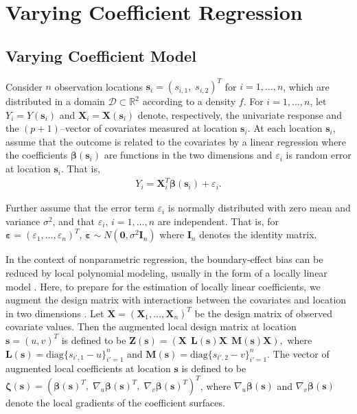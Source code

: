 \documentclass[authoryear,review, 12pt]{elsarticle}
\begin{document}
\section{Varying Coefficient Regression\label{sec:vcr}}

\subsection{Varying Coefficient Model}

Consider $n$ observation locations $\bm{s}_{i}=(s_{i,1},\; s_{i,2})^{T}$
for $i=1,\dots,n$, which are distributed in a domain $\mathcal{D}\subset\mathbb{R}^{2}$
according to a density $f$. For $i=1,\dots,n$, let $Y_{i}=Y(\bm{s}_{i})$
and $\bm{X}_{i}=\bm{X}(\bm{s}_{i})$ denote, respectively, the univariate
response and the $(p+1)$--vector of covariates measured at location
$\bm{s}_{i}$. At each location $\bm{s}_{i}$, assume that the outcome
is related to the covariates by a linear regression where the coefficients
$\bm{\beta}(\bm{s}_{i})$ are functions in the two dimensions and
$\varepsilon_{i}$ is random error at location $\bm{s}_{i}$. That
is, 
\begin{align}
Y_{i}=\bm{X}_{i}^{T}\bm{\beta}(\bm{s}_{i})+\varepsilon_{i}.\label{eq:lm(s)}
\end{align}

Further assume that the error term $\varepsilon_{i}$ is normally
distributed with zero mean and variance $\sigma^{2}$, and that $\varepsilon_{i}$,
$i=1,\dots,n$ are independent. That is, for $\bm{\varepsilon}=\left(\varepsilon_{1},\dots,\varepsilon_{n}\right)^{T}$,
$\bm{\varepsilon}\sim N\left(\bm{0},\sigma^{2}\bm{I}_{n}\right)$
where $\bm{I}_{n}$ denotes the identity matrix. 

In the context of nonparametric regression, the boundary-effect bias
can be reduced by local polynomial modeling, usually in the form of
a locally linear model \citep{Fan-Gijbels-1996}. Here, to prepare
for the estimation of locally linear coefficients, we augment the
design matrix with interactions between the covariates and location in two dimensions
\citep{Wang-2008b}. Let $\bm{X}=\left(\bm{X}_{1},\dots,\bm{X}_{n}\right)^{T}$
be the design matrix of observed covariate values. Then the augmented
local design matrix at location $\bm{s} = (u, v)^T$ is defined to be $\bm{Z}(\bm{s})=\left(\bm{X}\ \:\bm{L}(\bm{s}) \bm{X}\ \:\bm{M}(\bm{s}) \bm{X}\right),$
where $\bm{L}(\bm{s})=\text{diag}\{s_{i',1}-u\}_{i'=1}^{n}$ and
$\bm{M}(\bm{s})=\text{diag}\{s_{i',2}-v\}_{i'=1}^{n}$. 
The vector of augmented local coefficients at location $\bm{s}$ is defined to be $\bm{\zeta}(\bm{s})=\left(\bm{\beta}(\bm{s})^{T},\;\nabla_{u}\bm{\beta}(\bm{s})^{T},\;\nabla_{v}\bm{\beta}(\bm{s})^{T}\right)^{T}$,
where $\nabla_{u}\bm{\beta}(\bm{s})$ and $\nabla_{v}\bm{\beta}(\bm{s})$ denote the local gradients 
of the coefficient surfaces.
\end{document}
